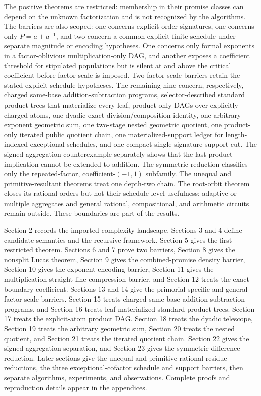 \documentclass[11pt]{article}
\begin{document}
The positive theorems are restricted: membership in their promise classes can
depend on the unknown factorization and is not recognized by the algorithms.
The barriers are also scoped: one concerns explicit order signatures,
one concerns only \(P=a+a^{-1}\), and two concern a common explicit finite
schedule under separate magnitude or encoding hypotheses. One concerns only
formal exponents in a factor-oblivious multiplication-only DAG, and another
exposes a coefficient threshold for stipulated populations but is silent at
and above the critical coefficient before factor scale is imposed. Two
factor-scale barriers retain the stated explicit-schedule hypotheses. The
remaining nine concern, respectively, charged same-base
addition-subtraction programs, selector-described standard product trees
that materialize every leaf, product-only DAGs over explicitly charged atoms,
one dyadic exact-division/composition identity, one arbitrary-exponent
geometric sum, one two-stage nested geometric quotient, one product-only
iterated public quotient chain, one materialized-support ledger for
length-indexed exceptional schedules, and one compact single-signature
support cut. The signed-aggregation counterexample
separately shows that the last product implication cannot be extended to
addition. The symmetric reduction classifies only the repeated-factor,
coefficient-\((-1,1)\) subfamily. The unequal and primitive-resultant
theorems treat one depth-two chain. The root-orbit theorem closes its rational
orders but not their schedule-level usefulness; adaptive or multiple
aggregates and general rational, compositional, and arithmetic circuits
remain outside. These boundaries are part of the results.

Section 2 records the imported complexity landscape. Sections 3 and 4 define
candidate semantics and the recursive framework. Section 5 gives the first
restricted theorem. Sections 6 and 7 prove two barriers, Section 8 gives the
nonsplit Lucas theorem, Section 9 gives the combined-promise density barrier,
Section 10 gives the exponent-encoding barrier, Section 11 gives the
multiplication straight-line compression barrier, and Section 12 treats the
exact boundary coefficient. Sections 13 and 14 give the primorial-specific
and general factor-scale barriers. Section 15 treats charged same-base
addition-subtraction programs, and Section 16 treats leaf-materialized
standard product trees. Section 17 treats the explicit-atom product DAG.
Section 18 treats the dyadic telescope, Section 19 treats the arbitrary
geometric sum, Section 20 treats the nested quotient, and Section 21 treats
the iterated quotient chain. Section 22 gives the signed-aggregation
separation, and Section 23 gives the symmetric-difference reduction. Later
sections give the unequal and primitive rational-residue reductions, the
three exceptional-cofactor schedule and support barriers, then separate algorithms, experiments,
and observations. Complete proofs and reproduction details appear in the
appendices.
\end{document}
